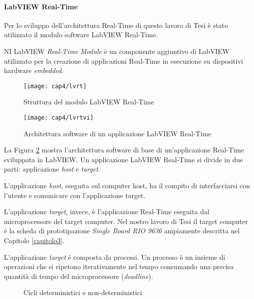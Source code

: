 \paragraph{LabVIEW Real-Time}
Per lo sviluppo dell'architettura Real-Time di questo lavoro di Tesi è stato utilizzato il modulo software LabVIEW Real-Time.

NI LabVIEW \textit{Real-Time Module} è un componente aggiuntivo di LabVIEW utilizzato per la creazione di applicazioni Real-Time in esecuzione su dispositivi hardware \textit{embedded}.

\begin{figure}  
  \begin{center}
    \texttt{[image: cap4/lvrt]}
    \caption{Struttura del modulo LabVIEW Real-Time}
    \label{labviewrt}
  \end{center}
\end{figure}

\begin{figure}  
  \begin{center}
    \texttt{[image: cap4/lvrtvi]}
    \caption{Architettura software di un applicazione LabVIEW Real-Time}
    \label{labviewrtvi}
  \end{center}
\end{figure}

La Figura \ref{labviewrtvi} mostra l'architettura software di base di un'applicazione Real-Time sviluppata in LabVIEW. Un applicazione LabVIEW Real-Time si divide in due parti: applicazione \textit{host} e \textit{target}.

L'applicazione \textit{host}, eseguita sul computer host, ha il compito di interfacciarsi con l'utente e comunicare con l'applicazione target. 

L'applicazione \textit{target}, invece, è l'applicazione Real-Time eseguita dal microprocessore del target computer. Nel nostro lavoro di Tesi il target computer è la scheda di prototipazione \textit{Single Board RIO 9636} ampiamente descritta nel Capitolo \ref{capitolo3}.

L'applicazione \textit{target} è composta da processi. Un processo è un insieme di operazioni che si ripetono iterativamente nel tempo consumando una precisa quantità di tempo del microprocessore (\textit{deadline}).
\begin{figure}
\centering
{}
\hspace{5mm}
\caption{Cicli deterministici e non-deterministici}
\end{figure}

